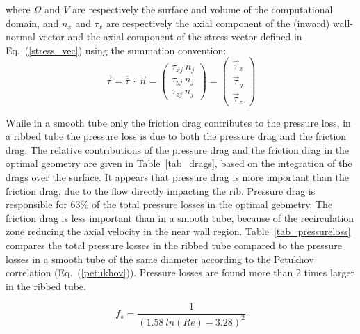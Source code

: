 \noindent where $\Omega$ and $V$ are respectively the surface and volume of the computational domain, and $n_x$ and $\tau_x$ are respectively the axial component of the (inward) wall-normal vector and the axial component of the stress vector defined in Eq.~(\ref{stress_vec}) using the summation convention:
\begin{equation}
\vec{\tau} = \overline{\overline{\tau}} ~ \cdot ~ \vec{n} = \begin{pmatrix} \tau_{xj} ~ n_j \\ \tau_{yj} ~ n_j \\ \tau_{zj} ~ n_j \end{pmatrix} = \begin{pmatrix} \vec{\tau}_x \\ \vec{\tau}_y \\ \vec{\tau}_z \end{pmatrix}
\label{stress_vec}
\end{equation}

While in a smooth tube only the friction drag contributes to the pressure loss, in a ribbed tube the pressure loss is due to both the pressure drag and the friction drag. The relative contributions of the pressure drag and the friction drag in the optimal geometry are given in Table~\ref{tab_drags}, based on the integration of the drags over the surface. It appears that pressure drag is more important than the friction drag, due to the flow directly impacting the rib. Pressure drag is responsible for $63 \%$ of the total pressure losses in the optimal geometry. The friction drag is less important than in a smooth tube, because of the recirculation zone reducing the axial velocity in the near wall region. Table~\ref{tab_pressureloss} compares the total pressure losses in the ribbed tube compared to the pressure losses in a smooth tube of the same diameter according to the Petukhov correlation \cite{PetukhovPopov1963} (Eq.~(\ref{petukhov})). Pressure losses are found more than 2 times larger in the ribbed tube.

\begin{equation}
f_s = \frac{1}{(1.58 ~ ln(Re) - 3.28)^2}
\label{petukhov}
\end{equation}\\

